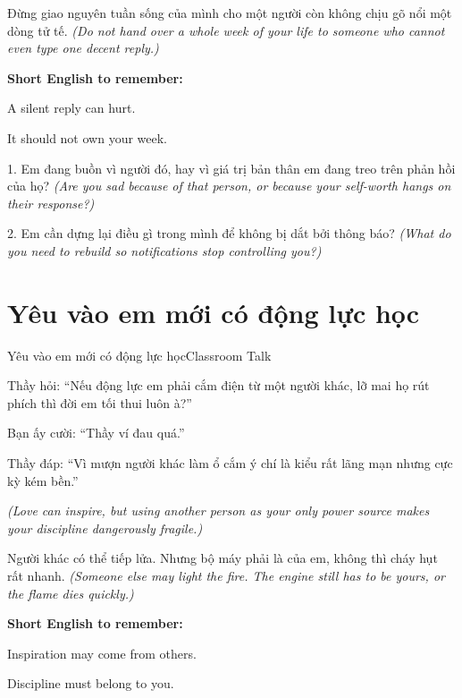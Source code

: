 \begin{baihoc}
Đừng giao nguyên tuần sống của mình cho một người còn không chịu gõ nổi một dòng tử tế.
\textit{(Do not hand over a whole week of your life to someone who cannot even type one decent reply.)}
\end{baihoc}

\begin{ghinhoanh}
\textbf{Short English to remember:}

A silent reply can hurt.

It should not own your week.
\end{ghinhoanh}

\begin{tuhocnhanh}
1. Em đang buồn vì người đó, hay vì giá trị bản thân em đang treo trên phản hồi của họ? \textit{(Are you sad because of that person, or because your self-worth hangs on their response?)}

2. Em cần dựng lại điều gì trong mình để không bị dắt bởi thông báo? \textit{(What do you need to rebuild so notifications stop controlling you?)}
\end{tuhocnhanh}
\ngancach

\section{Yêu vào em mới có động lực học}
\begin{truyen}{Yêu vào em mới có động lực học}{Classroom Talk}

Thầy hỏi: ``Nếu động lực em phải cắm điện từ một người khác, lỡ mai họ rút phích thì đời em tối thui luôn à?''

Bạn ấy cười: ``Thầy ví đau quá.''

Thầy đáp: ``Vì mượn người khác làm ổ cắm ý chí là kiểu rất lãng mạn nhưng cực kỳ kém bền.''

\textit{(Love can inspire, but using another person as your only power source makes your discipline dangerously fragile.)}
\end{truyen}

\begin{baihoc}
Người khác có thể tiếp lửa. Nhưng bộ máy phải là của em, không thì cháy hụt rất nhanh.
\textit{(Someone else may light the fire. The engine still has to be yours, or the flame dies quickly.)}
\end{baihoc}

\begin{ghinhoanh}
\textbf{Short English to remember:}

Inspiration may come from others.

Discipline must belong to you.
\end{ghinhoanh}


